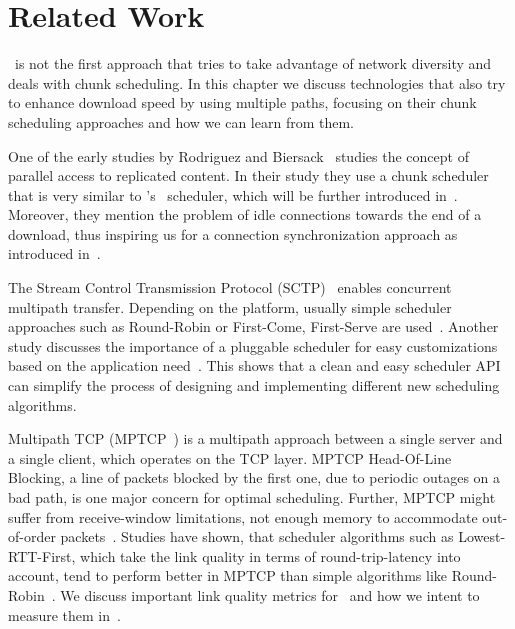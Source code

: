 \chapter{Related Work}
\label{ch:related-work}


\mhttp~is not the first approach that tries to take advantage of network diversity and deals with chunk scheduling. 
In this chapter we discuss technologies that also try to enhance download speed by using multiple paths, focusing on their chunk scheduling approaches and how we can learn from them.

One of the early studies by Rodriguez and Biersack~\cite{RODRIGUEZ02-DPA} studies the concept of parallel access to replicated content. 
In their study they use a chunk scheduler that is very similar to \protoold's \algbase~scheduler, which will be further introduced in~.
Moreover, they mention the problem of idle connections towards the end of a download, thus inspiring us for a connection synchronization approach as introduced in~.

The Stream Control Transmission Protocol (SCTP)~\cite{IYENGAR06-CMT} enables concurrent multipath transfer. 
Depending on the platform, usually simple scheduler approaches such as Round-Robin or First-Come, First-Serve are used~\cite{RFC-4960}. 
Another study discusses the importance of a pluggable scheduler for easy customizations based on the application need~\cite{YWANG11-INFO}.
This shows that a clean and easy scheduler API can simplify the process of designing and implementing different new scheduling algorithms. 

Multipath TCP (MPTCP~\cite{RFC-MPTCP,RAICIU12-HHC}) is a multipath approach between a single server and a single client, which operates on the TCP layer. 
MPTCP Head-Of-Line Blocking, \ie a line of packets blocked by the first one, due to periodic outages on a bad path, is one major concern for optimal scheduling. 
Further, MPTCP might suffer from receive-window limitations, \ie not enough memory to accommodate out-of-order packets~\cite{PAASCH14-MPTCP}. 
Studies have shown, that scheduler algorithms such as Lowest-RTT-First, which take the link quality in terms of round-trip-latency into account, tend to perform better in MPTCP than simple algorithms like Round-Robin~\cite{PAASCH14-MPTCP}.
We discuss important link quality metrics for \mhttp~and how we intent to measure them in~. 

